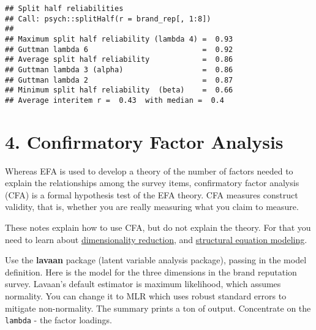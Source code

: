 \documentclass[
]{book}
\theoremstyle{definition}
\theoremstyle{definition}
\theoremstyle{definition}
\theoremstyle{definition}
\theoremstyle{remark}
\begin{document}
\begin{verbatim}
## Split half reliabilities  
## Call: psych::splitHalf(r = brand_rep[, 1:8])
## 
## Maximum split half reliability (lambda 4) =  0.93
## Guttman lambda 6                          =  0.92
## Average split half reliability            =  0.86
## Guttman lambda 3 (alpha)                  =  0.86
## Guttman lambda 2                          =  0.87
## Minimum split half reliability  (beta)    =  0.66
## Average interitem r =  0.43  with median =  0.4
\end{verbatim}

\hypertarget{confirmatory-factor-analysis}{%
\section{4. Confirmatory Factor Analysis}\label{confirmatory-factor-analysis}}

Whereas EFA is used to develop a theory of the number of factors needed to explain the relationships among the survey items, confirmatory factor analysis (CFA) is a formal hypothesis test of the EFA theory. CFA measures construct validity, that is, whether you are really measuring what you claim to measure.

These notes explain how to use CFA, but do not explain the theory. For that you need to learn about \href{https://www.datacamp.com/courses/dimensionality-reduction-in-r}{dimensionality reduction}, and \href{https://www.datacamp.com/courses/structural-equation-modeling-with-lavaan-in-r}{structural equation modeling}.

Use the \textbf{lavaan} package (latent variable analysis package), passing in the model definition. Here is the model for the three dimensions in the brand reputation survey. Lavaan's default estimator is maximum likelihood, which assumes normality. You can change it to MLR which uses robust standard errors to mitigate non-normality. The summary prints a ton of output. Concentrate on the \texttt{lambda} - the factor loadings.
\end{document}
